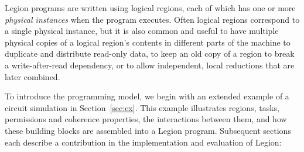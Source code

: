\documentclass[conference]{IEEEtran}
\begin{document}
Legion programs are written using logical regions, each of which
has one or more {\em physical instances} when the program executes.  Often
logical regions correspond to a single physical instance, but it is also common and useful
to have multiple physical copies of a logical region's contents in different parts of the machine 
to duplicate and distribute read-only data, to keep an old copy of a region to break a 
write-after-read dependency, or to allow independent, local reductions that are later combined.

To introduce the programming model, we begin with an extended example
of a circuit simulation in
Section~\ref{sec:ex}. This example illustrates regions, tasks,
permissions and coherence properties, the interactions between them,
and how these building blocks are assembled into a Legion
program.  Subsequent sections each describe a contribution in the
implementation and evaluation of Legion:


 
\end{document}
